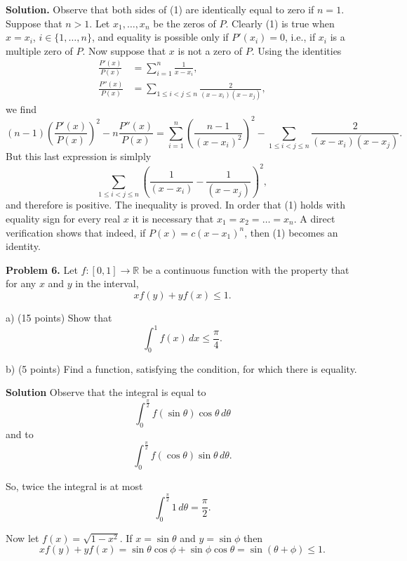 \documentclass{article}
\begin{document}
\textbf{Solution.} Observe that both sides of (1) are identically equal to zero
if \( n = 1 \). Suppose that \( n > 1 \).
Let \( x_1, \ldots, x_n \) be the zeros of \( P \). Clearly (1) is true when
\( x = x_i \), \( i \in \{1, \ldots, n\} \), and equality is possible only if \( P'(x_i) = 0 \), i.e., if \( x_i \) is a multiple zero of \( P \). Now suppose that \( x \) is not a zero of \( P \). Using the identities
\begin{align*}
    \frac{P'(x)}{P(x)} &= \sum_{i=1}^{n} \frac{1}{x - x_i}, \\
    \frac{P''(x)}{P(x)} &= \sum_{1 \leq i < j \leq n} \frac{2}{(x - x_i)(x - x_j)},
\end{align*}
we find
\begin{equation*}
    (n - 1)\left(\frac{P'(x)}{P(x)}\right)^2 - n\frac{P''(x)}{P(x)} =
\sum_{i=1}^{n} \left(\frac{n-1}{(x - x_i)^2}\right)^2 -
\sum_{1 \leq i < j \leq n} \frac{2}{(x - x_i)(x - x_j)}.
\end{equation*}
But this last expression is simlply
\begin{equation*}
    \sum_{1 \leq i < j \leq n} \left(\frac{1}{(x - x_i)} - \frac{1}{(x - x_j)} \right)^2,
\end{equation*}
and therefore is positive. The inequality is proved.
In order that (1) holds with equality sign for every real \( x \)
it is necessary that \( x_1 = x_2 = \ldots = x_n \).
A direct verification shows that indeed, if \( P(x) = c(x - x_1)^n \), then (1) becomes an identity.

\textbf{Problem 6.} Let \( f : [0,1] \rightarrow \mathbb{R} \)
be a continuous function with the property that for any \( x \) and \( y \) in the interval,
\[
xf(y)+yf(x) \leq 1.
\]

a) (15 points) Show that
\[
\int_{0}^{1} f(x) \, dx \leq \frac{\pi}{4}.
\]

b) (5 points) Find a function, satisfying the condition, for which there is equality.

\textbf{Solution} Observe that the integral is equal to
\[
\int_{0}^{\frac{\pi}{2}} f(\sin \theta) \cos \theta \, d\theta
\]
and to
\[
\int_{0}^{\frac{\pi}{2}} f(\cos \theta) \sin \theta \, d\theta.
\]

So, twice the integral is at most
\[
\int_{0}^{\frac{\pi}{2}} 1 \, d\theta = \frac{\pi}{2}.
\]

Now let \( f(x) = \sqrt{1 - x^2} \). If \( x = \sin \theta \) and \( y = \sin \phi \) then
\[
x f(y) + y f(x) = \sin \theta \cos \phi + \sin \phi \cos \theta = \sin(\theta + \phi) \leq 1.
\]
\end{document}
